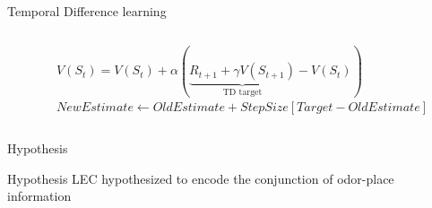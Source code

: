 \documentclass[bigger]{beamer}
\begin{document}
\begin{frame}[label={sec:orgc5901be}]{Temporal Difference learning}
\begin{columns}
\begin{column}{0.5\columnwidth}
\end{column}
\begin{column}{0.5\columnwidth}
\begin{adjustbox}{max width=\columnwidth, keepaspectratio}
$V(S_t) = V(S_t) + \alpha(\underbrace{R_{t+1} + \gamma V(S_{t+1})}_\text{TD target} - V(S_t))$
\end{adjustbox}\\[1em]
\begin{adjustbox}{max width=\columnwidth, keepaspectratio}
$NewEstimate \leftarrow OldEstimate + StepSize[Target - OldEstimate]$
\end{adjustbox}
\end{column}
\end{columns}
\end{frame}
\begin{frame}[label={sec:org5707c59}]{Hypothesis}
\begin{exampleblock}{Hypothesis}
LEC hypothesized to encode the conjunction of odor-place information
\end{exampleblock}
\end{frame}
\end{document}
